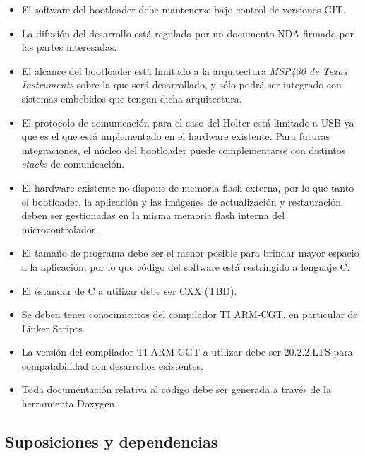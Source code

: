 \documentclass[12pt,a4paper]{article}
\begin{document}
\begin{itemize}
	\item El software del bootloader debe mantenerse bajo control de versiones GIT.
	
	\item La difusión del desarrollo está regulada por un documento NDA firmado por las partes interesadas.

	\item El alcance del bootloader está limitado a la arquitectura \textit{MSP430 de Texas Instruments} sobre la que será desarrollado, y sólo podrá 
	ser integrado con sistemas embebidos que tengan dicha arquitectura.

	\item El protocolo de comunicación para el caso del Holter está limitado a USB ya que es el que está implementado en el hardware existente. Para 
	futuras integraciones, el núcleo del bootloader puede complementarse con distintos \textit{stacks} de comunicación.

	\item El hardware existente no dispone de memoria flash externa, por lo que tanto el bootloader, la aplicación y las imágenes de actualización y 
	restauración deben ser gestionadas en la misma memoria flash interna del microcontrolador.

	\item El tamaño de programa debe ser el menor posible para brindar mayor espacio a la aplicación, por lo que código del software está 
	restringido a lenguaje C.
	
	\item El éstandar de C a utilizar debe ser CXX (TBD).

	\item Se deben tener conocimientos del compilador TI ARM-CGT, en particular de Linker Scripts.
	
	\item La versión del compilador TI ARM-CGT a utilizar debe ser 20.2.2.LTS para compatabilidad con desarrollos existentes.

	\item Toda documentación relativa al código debe ser generada a través de la herramienta Doxygen.
\end{itemize}


\subsection{Suposiciones y dependencias}
\label{sec:assumptions_dependencies}
\end{document}
